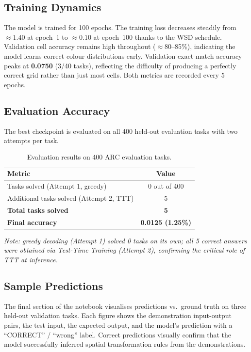 \documentclass[11pt,a4paper]{article}
\begin{document}
\subsection{Training Dynamics}

The model is trained for 100 epochs.  The training loss decreases steadily from
$\approx 1.40$ at epoch~1 to $\approx 0.10$ at epoch~100 thanks to the WSD schedule.
Validation cell accuracy remains high throughout ($\approx$80--85\%), indicating the
model learns correct colour distributions early.  Validation exact-match accuracy
peaks at \textbf{0.0750} (3/40 tasks), reflecting the difficulty of producing a
perfectly correct grid rather than just most cells.  Both metrics are recorded every
5 epochs.

\subsection{Evaluation Accuracy}

The best checkpoint is evaluated on all 400 held-out evaluation tasks with two attempts
per task.

\begin{table}[H]
\centering
\caption{Evaluation results on 400 ARC evaluation tasks.}
\label{tab:eval}
\begin{tabular}{lc}
\toprule
Metric & Value \\
\midrule
Tasks solved (Attempt 1, greedy)          & 0 out of 400 \\
Additional tasks solved (Attempt 2, TTT)  & 5 \\
\textbf{Total tasks solved}               & \textbf{5} \\
\textbf{Final accuracy}                   & \textbf{0.0125 (1.25\%)} \\
\bottomrule
\end{tabular}
\end{table}

\noindent\textit{Note: greedy decoding (Attempt 1) solved 0 tasks on its own;
all 5 correct answers were obtained via Test-Time Training (Attempt 2),
confirming the critical role of TTT at inference.}

\subsection{Sample Predictions}

The final section of the notebook visualises predictions vs.\ ground truth on three
held-out validation tasks.  Each figure shows the demonstration input-output pairs,
the test input, the expected output, and the model's prediction with a
``CORRECT'' / ``wrong'' label.  Correct predictions visually confirm that the model
successfully inferred spatial transformation rules from the demonstrations.
\end{document}
